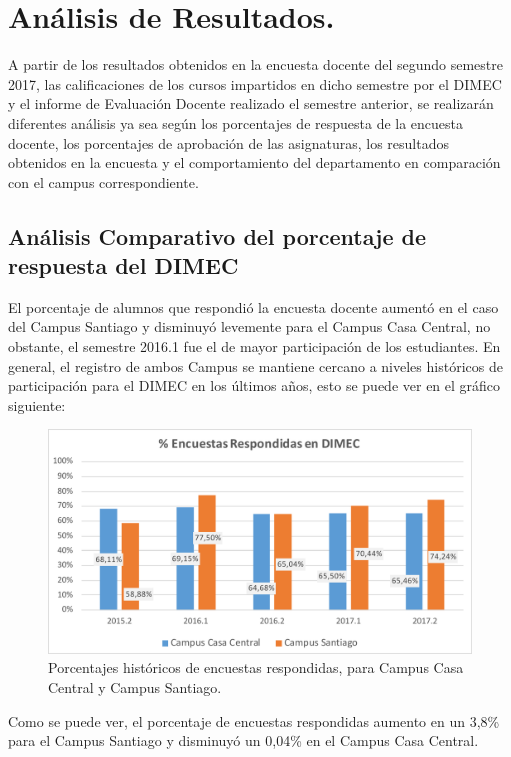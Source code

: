 \documentclass[12pt]{article}
\begin{document}
\section{Análisis de Resultados.}
\begin{text}
A partir de los resultados obtenidos en la encuesta docente del segundo semestre 2017, las calificaciones de los cursos impartidos en dicho semestre por el DIMEC y el informe de Evaluación Docente realizado el semestre anterior, se realizarán diferentes análisis ya sea según los porcentajes de respuesta de la encuesta docente, los porcentajes de aprobación de las asignaturas, los resultados obtenidos en la encuesta y el comportamiento del departamento en comparación con el campus correspondiente. 
\end{text}

\subsection{Análisis Comparativo del porcentaje de respuesta del DIMEC}
\begin{text}
El porcentaje de alumnos que respondió la encuesta docente aumentó en el caso del Campus Santiago y disminuyó levemente para el Campus Casa Central, no obstante, el semestre 2016.1 fue el de mayor participación de los estudiantes. En general, el registro de ambos Campus se mantiene cercano a niveles históricos de participación para el DIMEC en los últimos años, esto se puede ver en el gráfico siguiente:
\end{text}
\begin{figure}[H]
    \centering
    \includegraphics[width=1\textwidth]{AR1Resp.pdf}
    \caption{Porcentajes históricos de encuestas respondidas, para Campus Casa Central y Campus Santiago.}
    \label{fig:resp}
\end{figure}
\begin{text}
Como se puede ver, el porcentaje de encuestas respondidas aumento en un 3,8\% para el Campus Santiago y disminuyó un 0,04\% en el Campus Casa Central.
\end{text}
\newpage
\end{document}

